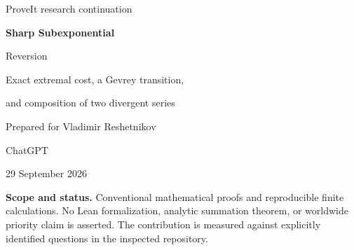\documentclass[11pt,a4paper]{article}
\theoremstyle{definition}
\theoremstyle{remark}
\newcommand{\ee}{\mathrm e}
\numberwithin{equation}{section}
\begin{document}
\hypersetup{pageanchor=false}
\begin{titlepage}
\vspace*{10mm}
{\color{MidnightBlue}\Large ProveIt research continuation\par}
\vspace{12mm}
{\Huge\bfseries Sharp Subexponential\par Reversion\par}
\vspace{7mm}
{\Large Exact extremal cost, a Gevrey transition,\par and composition of two divergent series\par}
\vspace{12mm}
{\large Prepared for Vladimir Reshetnikov\par}
{\large ChatGPT\par}
{29 September 2026\par}
\vspace{12mm}
\begin{abstract}
Exact preservation of a weighted coefficient type under formal reversion
is already established in the inspected ProveIt corpus. It does not
quantify the subexponential amplification at the critical coefficient
radius. We address that subsequent question by solving a coefficientwise
extremal problem for two factorial normalizations. A single negative
series attains the worst inverse coefficient simultaneously at every
degree. For its normalized inverse amplification $R_n$, we prove
$\log R_n\sim Cn^{1-s}$ for every $0<s<1$, a multiplicative equivalent
$R_n\sim\exp(Cn^{1-s})$ for $s>1/2$, and the exact additional constant
at $s=1/2$. A uniform equivalent yields the crossover
$R_n\to\exp(C\ee^{-t})$ when $s=1+t/\log n$. Consequently, fixed-radius
factorial coefficient balls are stable under inversion exactly for
$s\ge1$, despite exact type preservation at every positive order.

A second result answers the Gevrey version of the repository's question
about two divergent composition arguments: their types obey a sharp
maximum inequality, with equality whenever the two competing types are
unequal. Finally, an explicit positive-coefficient series has a full
normalized root limit although its inverse has infinitely many zero
coefficients. All proofs are supplied. Finite exact checks and numerical
diagnostics are distinguished from proofs and from Lean verification.
\end{abstract}
\vfill
\small
\textbf{Scope and status.} Conventional mathematical proofs and reproducible
finite calculations. No Lean formalization, analytic summation theorem,
or worldwide priority claim is asserted. The contribution is measured
against explicitly identified questions in the inspected repository.
\end{titlepage}
\hypersetup{pageanchor=true}
\tableofcontents
\clearpage
\end{document}

